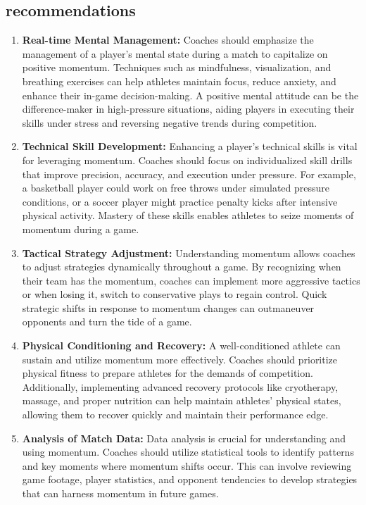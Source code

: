 \documentclass{article}
\begin{document}
\subsection{recommendations}
\begin{enumerate}
      \item \textbf{Real-time Mental Management:} Coaches should emphasize the management of a player's mental state during a match to capitalize on positive momentum. Techniques such as mindfulness, visualization, and breathing exercises can help athletes maintain focus, reduce anxiety, and enhance their in-game decision-making. A positive mental attitude can be the difference-maker in high-pressure situations, aiding players in executing their skills under stress and reversing negative trends during competition.
      \item \textbf{Technical Skill Development:} Enhancing a player's technical skills is vital for leveraging momentum. Coaches should focus on individualized skill drills that improve precision, accuracy, and execution under pressure. For example, a basketball player could work on free throws under simulated pressure conditions, or a soccer player might practice penalty kicks after intensive physical activity. Mastery of these skills enables athletes to seize moments of momentum during a game.
      \item \textbf{Tactical Strategy Adjustment:} Understanding momentum allows coaches to adjust strategies dynamically throughout a game. By recognizing when their team has the momentum, coaches can implement more aggressive tactics or when losing it, switch to conservative plays to regain control. Quick strategic shifts in response to momentum changes can outmaneuver opponents and turn the tide of a game.
      \item \textbf{Physical Conditioning and Recovery:} A well-conditioned athlete can sustain and utilize momentum more effectively. Coaches should prioritize physical fitness to prepare athletes for the demands of competition. Additionally, implementing advanced recovery protocols like cryotherapy, massage, and proper nutrition can help maintain athletes' physical states, allowing them to recover quickly and maintain their performance edge.
      \item \textbf{Analysis of Match Data:} Data analysis is crucial for understanding and using momentum. Coaches should utilize statistical tools to identify patterns and key moments where momentum shifts occur. This can involve reviewing game footage, player statistics, and opponent tendencies to develop strategies that can harness momentum in future games.

\end{enumerate}
\end{document}
